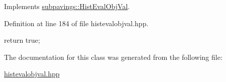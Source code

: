 \-Implements \hyperlink{classsubpavings_1_1HistEvalObjVal_a8a2e88be92ac0dff1ce9de2250ec34bd}{subpavings\-::\-Hist\-Eval\-Obj\-Val}.



\-Definition at line 184 of file histevalobjval.\-hpp.


\begin{DoxyCode}
    { return true; }
\end{DoxyCode}


\-The documentation for this class was generated from the following file\-:\begin{DoxyCompactItemize}
\item 
\hyperlink{histevalobjval_8hpp}{histevalobjval.\-hpp}\end{DoxyCompactItemize}
